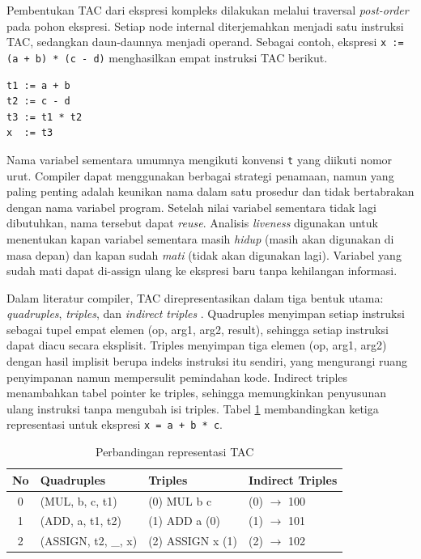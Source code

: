 Pembentukan TAC dari ekspresi kompleks dilakukan melalui traversal \textit{post-order} pada pohon ekspresi. Setiap node internal diterjemahkan menjadi satu instruksi TAC, sedangkan daun-daunnya menjadi operand. Sebagai contoh, ekspresi \texttt{x := (a + b) * (c - d)} menghasilkan empat instruksi TAC berikut.

\begin{tcolorbox}[title=Contoh TAC,colback=gray!5,colframe=black!60,boxrule=0.5pt,arc=2mm]
\begin{verbatim}
t1 := a + b
t2 := c - d
t3 := t1 * t2
x  := t3
\end{verbatim}
\end{tcolorbox}

Nama variabel sementara umumnya mengikuti konvensi \texttt{t} yang diikuti nomor urut. Compiler dapat menggunakan berbagai strategi penamaan, namun yang paling penting adalah keunikan nama dalam satu prosedur dan tidak bertabrakan dengan nama variabel program. Setelah nilai variabel sementara tidak lagi dibutuhkan, nama tersebut dapat \textit{reuse}. Analisis \textit{liveness} digunakan untuk menentukan kapan variabel sementara masih \textit{hidup} (masih akan digunakan di masa depan) dan kapan sudah \textit{mati} (tidak akan digunakan lagi). Variabel yang sudah mati dapat di-assign ulang ke ekspresi baru tanpa kehilangan informasi.

Dalam literatur compiler, TAC direpresentasikan dalam tiga bentuk utama: \textit{quadruples}, \textit{triples}, dan \textit{indirect triples} \cite{aho2007compilers}. Quadruples menyimpan setiap instruksi sebagai tupel empat elemen (op, arg1, arg2, result), sehingga setiap instruksi dapat diacu secara eksplisit. Triples menyimpan tiga elemen (op, arg1, arg2) dengan hasil implisit berupa indeks instruksi itu sendiri, yang mengurangi ruang penyimpanan namun mempersulit pemindahan kode. Indirect triples menambahkan tabel pointer ke triples, sehingga memungkinkan penyusunan ulang instruksi tanpa mengubah isi triples. Tabel \ref{tab:tac-repr} membandingkan ketiga representasi untuk ekspresi \texttt{x = a + b * c}.

\begin{table}[H]
    \centering
    \caption{Perbandingan representasi TAC}
    \label{tab:tac-repr}
    \small
    \begin{tabularx}{\textwidth}{c X X X}
        \toprule
        \textbf{No} & \textbf{Quadruples} & \textbf{Triples} & \textbf{Indirect Triples} \\
        \midrule
        0 & (MUL, b, c, t1) & (0) MUL b c & (0) $\rightarrow$ 100 \\
        1 & (ADD, a, t1, t2) & (1) ADD a (0) & (1) $\rightarrow$ 101 \\
        2 & (ASSIGN, t2, \_, x) & (2) ASSIGN x (1) & (2) $\rightarrow$ 102 \\
        \bottomrule
    \end{tabularx}
\end{table}


